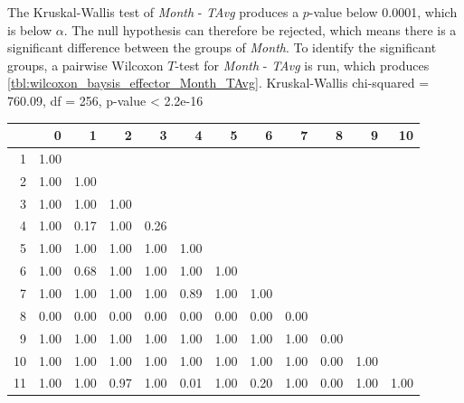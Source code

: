 The Kruskal-Wallis test of \textit{Month} - \textit{TAvg} produces a $p$-value below 0.0001, which is below $\alpha$. The null hypothesis can therefore be rejected, which means there is a significant difference between the groups of \textit{Month}. To identify the significant groups, a pairwise Wilcoxon $T$-test for \textit{Month} - \textit{TAvg} is run, which produces \cref{tbl:wilcoxon_baysis_effector_Month_TAvg}. 
Kruskal-Wallis chi-squared = 760.09, df = 256, p-value < 2.2e-16
% 
\begin{tabular}{rrrrrrrrrrrr}
  \hline
 & 0 & 1 & 2 & 3 & 4 & 5 & 6 & 7 & 8 & 9 & 10 \\ 
  \hline
1 & 1.00 &  &  &  &  &  &  &  &  &  &  \\ 
  2 & 1.00 & 1.00 &  &  &  &  &  &  &  &  &  \\ 
  3 & 1.00 & 1.00 & 1.00 &  &  &  &  &  &  &  &  \\ 
  4 & 1.00 & 0.17 & 1.00 & 0.26 &  &  &  &  &  &  &  \\ 
  5 & 1.00 & 1.00 & 1.00 & 1.00 & 1.00 &  &  &  &  &  &  \\ 
  6 & 1.00 & 0.68 & 1.00 & 1.00 & 1.00 & 1.00 &  &  &  &  &  \\ 
  7 & 1.00 & 1.00 & 1.00 & 1.00 & 0.89 & 1.00 & 1.00 &  &  &  &  \\ 
  8 & 0.00 & 0.00 & 0.00 & 0.00 & 0.00 & 0.00 & 0.00 & 0.00 &  &  &  \\ 
  9 & 1.00 & 1.00 & 1.00 & 1.00 & 1.00 & 1.00 & 1.00 & 1.00 & 0.00 &  &  \\ 
  10 & 1.00 & 1.00 & 1.00 & 1.00 & 1.00 & 1.00 & 1.00 & 1.00 & 0.00 & 1.00 &  \\ 
  11 & 1.00 & 1.00 & 0.97 & 1.00 & 0.01 & 1.00 & 0.20 & 1.00 & 0.00 & 1.00 & 1.00 \\ 
   \hline
\end{tabular}
% 
